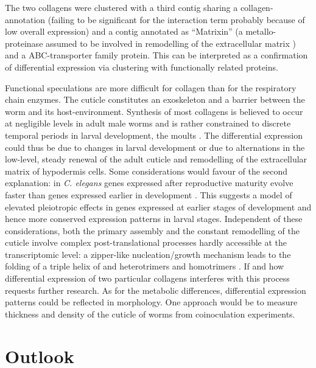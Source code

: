 The two collagens were clustered with a third contig sharing a
collagen-annotation (failing to be significant for the interaction
term probably because of low overall expression) and a contig
annotated as ``Matrixin'' (a metallo-proteinase assumed to be involved
in remodelling of the extracellular matrix \cite{mealloprot}) and a
ABC-transporter family protein. This can be interpreted as a
confirmation of differential expression via clustering with
functionally related proteins.

Functional speculations are more difficult for collagen than for the
respiratory chain enzymes. The cuticle constitutes an exoskeleton and
a barrier between the worm and its host-environment. Synthesis of most
collagens is believed to occur at negligible levels in adult male
worms and is rather constrained to discrete temporal periods in larval
development, the moults \cite{pmid10637627}. The differential
expression could thus be due to changes in larval development or due
to alternations in the low-level, steady renewal of the adult cuticle
and remodelling of the extracellular matrix of hypodermis cells. Some
considerations would favour of the second explanation: in
\textit{C. elegans} genes expressed after reproductive maturity evolve
faster than genes expressed earlier in development
\cite{pmid15371532}. This suggests a model of elevated pleiotropic
effects in genes expressed at earlier stages of development and hence
more conserved expression patterns in larval stages. Independent of
these considerations, both the primary assembly and the constant
remodelling of the cuticle involve complex post-translational
processes hardly accessible at the transcriptomic level: a zipper-like
nucleation/growth mechanism leads to the folding of a triple helix of
and heterotrimers and homotrimers \cite{kennedy2001parasitic}. If and
how differential expression of two particular collagens interferes
with this process requests further research. As for the metabolic
differences, differential expression patterns could be reflected in
morphology. One approach would be to measure thickness and density of
the cuticle of worms from coinoculation experiments.

\section{Outlook}

